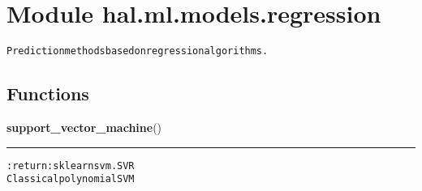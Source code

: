 %
%
%


\section{Module hal.ml.models.regression}

    \label{hal:ml:models:regression}
\begin{alltt}
Prediction methods based on regression algorithms. 
\end{alltt}



  \subsection{Functions}

    \label{hal:ml:models:regression:support_vector_machine}

    \vspace{0.5ex}

\hspace{.8\funcindent}\begin{boxedminipage}{\funcwidth}

    \raggedright \textbf{support\_vector\_machine}()

    \vspace{-1.5ex}

    \rule{\textwidth}{0.5\fboxrule}
\setlength{\parskip}{2ex}
\begin{alltt}

:return: sklearn svm.SVR
    Classical polynomial SVM
\end{alltt}

\setlength{\parskip}{1ex}
    \end{boxedminipage}

